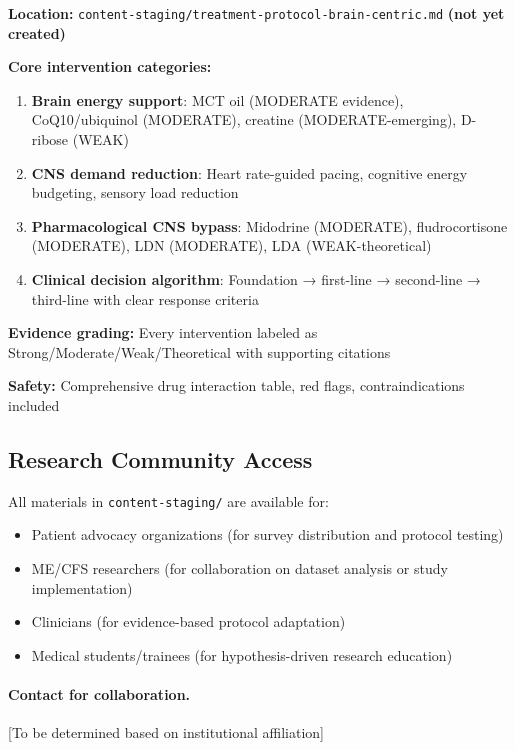 \textbf{Location:} \texttt{content-staging/treatment-protocol-brain-centric.md} \textbf{(not yet created)}

\textbf{Core intervention categories:}
\begin{enumerate}
    \item \textbf{Brain energy support}: MCT oil (MODERATE evidence), CoQ10/ubiquinol (MODERATE), creatine (MODERATE-emerging), D-ribose (WEAK)
    \item \textbf{CNS demand reduction}: Heart rate-guided pacing, cognitive energy budgeting, sensory load reduction
    \item \textbf{Pharmacological CNS bypass}: Midodrine (MODERATE), fludrocortisone (MODERATE), LDN (MODERATE), LDA (WEAK-theoretical)
    \item \textbf{Clinical decision algorithm}: Foundation → first-line → second-line → third-line with clear response criteria
\end{enumerate}

\textbf{Evidence grading:} Every intervention labeled as Strong/Moderate/Weak/Theoretical with supporting citations

\textbf{Safety:} Comprehensive drug interaction table, red flags, contraindications included

\subsection{Research Community Access}

All materials in \texttt{content-staging/} are available for:
\begin{itemize}
    \item Patient advocacy organizations (for survey distribution and protocol testing)
    \item ME/CFS researchers (for collaboration on dataset analysis or study implementation)
    \item Clinicians (for evidence-based protocol adaptation)
    \item Medical students/trainees (for hypothesis-driven research education)
\end{itemize}

\paragraph{Contact for collaboration.} [To be determined based on institutional affiliation]

